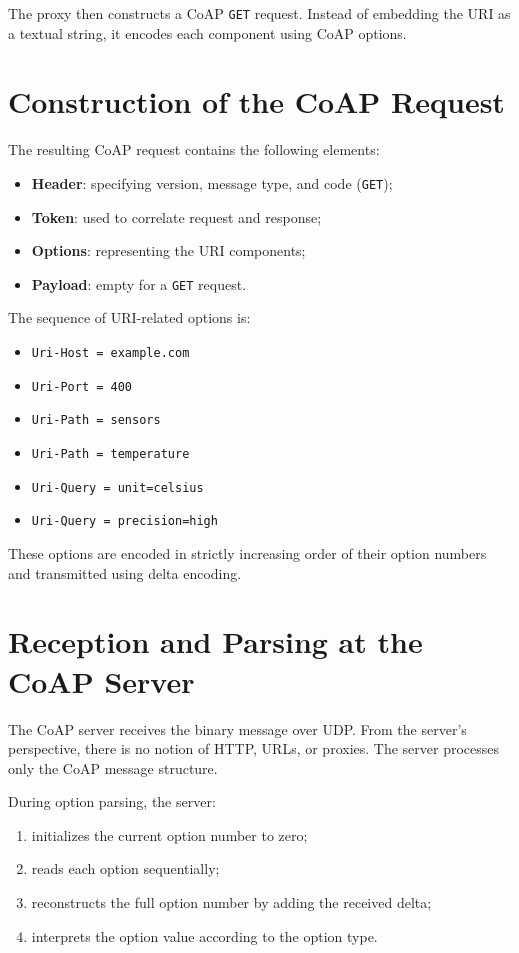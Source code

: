 \documentclass{scrbook}
\begin{document}
The proxy then constructs a CoAP \texttt{GET} request. Instead of embedding the URI as a textual string, it encodes each component using CoAP options.

\section{Construction of the CoAP Request}

The resulting CoAP request contains the following elements:

\begin{itemize}
    \item \textbf{Header}: specifying version, message type, and code (\texttt{GET});
    \item \textbf{Token}: used to correlate request and response;
    \item \textbf{Options}: representing the URI components;
    \item \textbf{Payload}: empty for a \texttt{GET} request.
\end{itemize}

The sequence of URI-related options is:

\begin{itemize}
    \item \texttt{Uri-Host = example.com}
    \item \texttt{Uri-Port = 400}
    \item \texttt{Uri-Path = sensors}
    \item \texttt{Uri-Path = temperature}
    \item \texttt{Uri-Query = unit=celsius}
    \item \texttt{Uri-Query = precision=high}
\end{itemize}

These options are encoded in strictly increasing order of their option numbers and transmitted using delta encoding.

\section{Reception and Parsing at the CoAP Server}

The CoAP server receives the binary message over UDP. From the server’s perspective, there is no notion of HTTP, URLs, or proxies. The server processes only the CoAP message structure.

During option parsing, the server:

\begin{enumerate}
    \item initializes the current option number to zero;
    \item reads each option sequentially;
    \item reconstructs the full option number by adding the received delta;
    \item interprets the option value according to the option type.
\end{enumerate}
\end{document}
